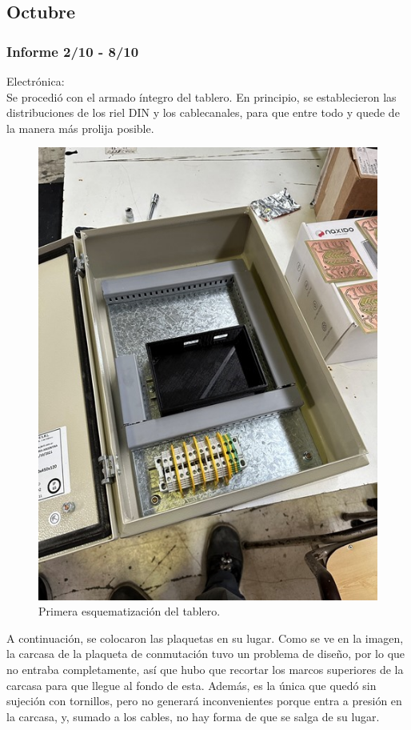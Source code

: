 \subsection{Octubre}

\subsubsection{Informe 2/10 - 8/10}

Electrónica:\\

Se procedió con el armado íntegro del tablero.
En principio, se establecieron las distribuciones de los riel DIN y los cablecanales, para que entre todo y quede de la manera más prolija posible.\\

\begin{figure}[H]
    \centering
    \includegraphics[width=0.75\linewidth]{informes/IMG_9287.jpg}
    \caption{Primera esquematización del tablero.}
\end{figure}

A continuación, se colocaron las plaquetas en su lugar. 
Como se ve en la imagen, la carcasa de la plaqueta de conmutación tuvo un problema de diseño, por lo que no entraba completamente, así que hubo que recortar los marcos superiores de la carcasa para que llegue al fondo de esta. Además, es la única que quedó sin sujeción con tornillos, pero no generará inconvenientes porque entra a presión en la carcasa, y, sumado a los cables, no hay forma de que se salga de su lugar.\\

